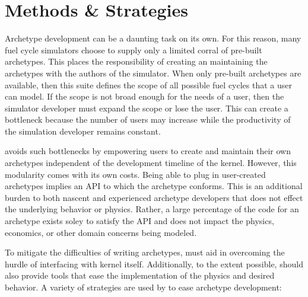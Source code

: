 \section{Methods \& Strategies}
\label{sec-methods}

Archetype development can be a daunting task on its own. For this reason, 
many fuel cycle simulators choose to supply only a limited corral of 
pre-built archetypes. This places the responsibility of creating an maintaining 
the archetypes with the authors of the simulator.  When only pre-built archetypes are available, then this suite defines the scope 
of all possible fuel cycles that a user can model. If the scope is not broad 
enough for the needs of a user, then the simulator developer must expand the 
scope or lose the user.  This can create a bottleneck because the number of users 
may increase while the productivity of the simulation developer remains constant.

\Cyclus avoids such bottlenecks by empowering users to create and maintain 
their own archetypes independent of the development timeline of the \cyclus 
kernel. However, this modularity comes with its own costs. Being able to 
plug in user-created archetypes implies an \gls{API} to which 
the archetype conforms. This is an 
additional burden to both nascent and experienced archetype developers that 
does not effect the underlying behavior or physics. Rather, a large percentage of the
code for an archetype exists soley to satisfy the \cyclus \gls{API} and does not
impact the physics, economics, or other domain concerns being modeled.

To mitigate the difficulties of writing archetypes, 
\cyclus must aid in overcoming the hurdle of interfacing with 
kernel itself. Additionally, to the extent possible, \cyclus should 
also provide tools that 
ease the implementation of the physics and desired behavior. 
A variety of strategies are used by \cyclus to ease archetype development: 

